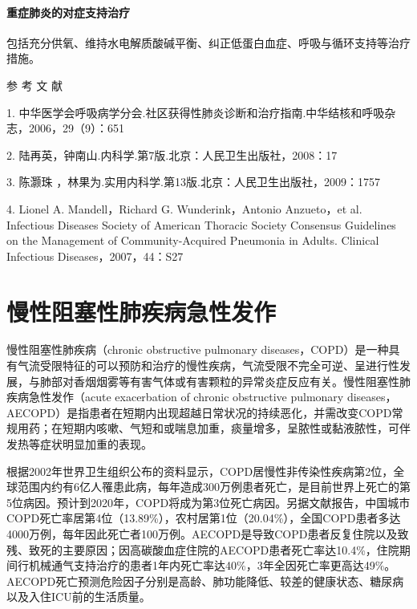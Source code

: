 \subsubsection{重症肺炎的对症支持治疗}

包括充分供氧、维持水电解质酸碱平衡、纠正低蛋白血症、呼吸与循环支持等治疗措施。

\protect\hypertarget{text00273.html}{}{}

\hypertarget{text00273.htmlux5cux23CHP9-5-4}{}
参 考 文 献

1.
中华医学会呼吸病学分会.社区获得性肺炎诊断和治疗指南.中华结核和呼吸杂志，2006，29（9）：651

2. 陆再英，钟南山.内科学.第7版.北京：人民卫生出版社，2008：17

3. 陈灏珠 ，林果为.实用内科学.第13版.北京：人民卫生出版社，2009：1757

4. Lionel A. Mandell，Richard G. Wunderink，Antonio Anzueto，et al.
Infectious Diseases Society of American Thoracic Society Consensus
Guidelines on the Management of Community-Acquired Pneumonia in Adults.
Clinical Infectious Diseases，2007，44：S27

\protect\hypertarget{text00274.html}{}{}

\chapter{慢性阻塞性肺疾病急性发作}

慢性阻塞性肺疾病（chronic obstructive pulmonary
diseases，COPD）是一种具有气流受限特征的可以预防和治疗的慢性疾病，气流受限不完全可逆、呈进行性发展，与肺部对香烟烟雾等有害气体或有害颗粒的异常炎症反应有关。慢性阻塞性肺疾病急性发作（acute
exacerbation of chronic obstructive pulmonary
diseases，AECOPD）是指患者在短期内出现超越日常状况的持续恶化，并需改变COPD常规用药；在短期内咳嗽、气短和或喘息加重，痰量增多，呈脓性或黏液脓性，可伴发热等症状明显加重的表现。

根据2002年世界卫生组织公布的资料显示，COPD居慢性非传染性疾病第2位，全球范围内约有6亿人罹患此病，每年造成300万例患者死亡，是目前世界上死亡的第5位病因。预计到2020年，COPD将成为第3位死亡病因。另据文献报告，中国城市COPD死亡率居第4位（13.89\%），农村居第1位（20.04\%），全国COPD患者多达4000万例，每年因此死亡者100万例。AECOPD是导致COPD患者反复住院以及致残、致死的主要原因；因高碳酸血症住院的AECOPD患者死亡率达10.4\%，住院期间行机械通气支持治疗的患者1年内死亡率达40\%，3年全因死亡率更高达49\%。AECOPD死亡预测危险因子分别是高龄、肺功能降低、较差的健康状态、糖尿病以及入住ICU前的生活质量。


